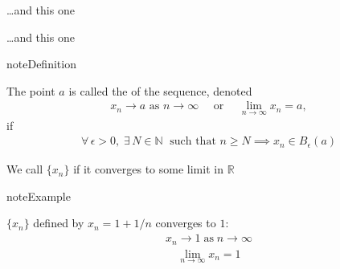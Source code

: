 \documentclass[letterpaper,10pt,english]{jupyterBook}
\begin{document}
\sphinxAtStartPar
…and this one

\begin{figure}[htbp]
\centering

\noindent{}
\end{figure}

\sphinxAtStartPar
…and this one

\begin{figure}[htbp]
\centering

\noindent{}
\end{figure}

\begin{sphinxadmonition}{note}{Definition}

\sphinxAtStartPar
The point \(a\) is called the  of the sequence, denoted
\begin{equation*}
\begin{split} 
x_n \to a \text{ as } n \to \infty 
\quad \text{ or } \quad
\lim_{n \to \infty} x_n = a,
\end{split}
\end{equation*}
\sphinxAtStartPar
if
\begin{equation*}
\begin{split}
\forall \, \epsilon > 0, \;
\exists \, N \in \mathbb{N} \; 
\text{ such that } n \geq N \implies x_n \in B_{\epsilon}(a)
\end{split}
\end{equation*}\end{sphinxadmonition}

\sphinxAtStartPar
We call \(\{ x_n \}\)  if it converges to some limit in
\(\mathbb{R}\)

\begin{sphinxadmonition}{note}{Example}

\sphinxAtStartPar
\(\{x_n\}\) defined by \(x_n = 1 + 1/n\) converges to \(1\):
\begin{equation*}
\begin{split}
x_n \to 1 \; \mathrm{as} \; n \to \infty
\end{split}
\end{equation*}\begin{equation*}
\begin{split}
\lim_{n \to \infty} x_n = 1
\end{split}
\end{equation*}\end{sphinxadmonition}
\end{document}
